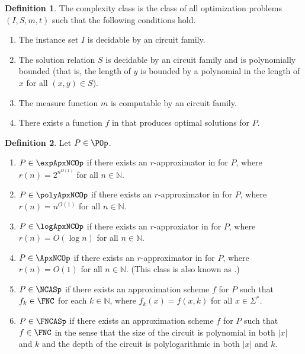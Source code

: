\documentclass[]{article}
\theoremstyle{plain}
\theoremstyle{definition}
\newtheorem{definition}{Definition}
\begin{document}
\begin{definition}\label{def:poprime}
  The complexity class \POp{} is the class of all optimization problems $(I, S, m, t)$ such that the following conditions hold.
  \begin{enumerate}
  \item The instance set $I$ is decidable by an \NC{} circuit family.
  \item The solution relation $S$ is decidable by an \NC{} circuit family and is polynomially bounded (that is, the length of $y$ is bounded by a polynomial in the length of $x$ for all $(x, y)\in S$).
  \item The measure function $m$ is computable by an \FNC{} circuit family.
  \item There exists a function $f$ in \FP{} that produces optimal solutions for $P$.
  \end{enumerate}
\end{definition}

\begin{definition}\label{def:ncxprime}
  Let $P\in\POp$.
  \begin{enumerate}
  \item $P\in\expApxNCOp$ if there exists an $r$-approximator in \FNC{} for $P$, where $r(n)=2^{n^{O(1)}}$ for all $n\in\mathbb{N}$.
  \item $P\in\polyApxNCOp$ if there exists an $r$-approximator in \FNC{} for $P$, where $r(n)=n^{O(1)}$ for all $n\in\mathbb{N}$.
  \item $P\in\logApxNCOp$ if there exists an $r$-approxiator in \FNC{} for $P$, where $r(n)=O(\log n)$ for all $n\in\mathbb{N}$.
  \item $P\in\ApxNCOp$ if there exists an $r$-approximator in \FNC{} for $P$, where $r(n)=O(1)$ for all $n\in\mathbb{N}$.
    (This class is also known as \NCX.)
  \item $P\in\NCASp$ if there exists an approximation scheme $f$ for $P$ such that $f_k\in\FNC$ for each $k\in\mathbb{N}$, where $f_k(x)=f(x, k)$ for all $x\in\Sigma^*$.
  \item $P\in\FNCASp$ if there exists an approximation scheme $f$ for $P$ such that $f\in\FNC$ in the sense that the size of the circuit is polynomial in both $|x|$ and $k$ and the depth of the circuit is polylogarithmic in both $|x|$ and $k$.
  \end{enumerate}
\end{definition}
\end{document}

